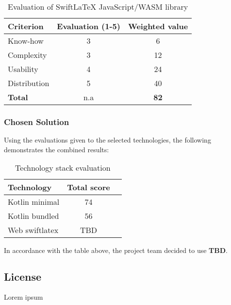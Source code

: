 \begin{table}[H]
    \centering
    \begin{tabular}{|l|c|c|}
        \hline
        \textbf{Criterion} & \textbf{Evaluation (1-5)} & \textbf{Weighted value} \\
        \hline
        Know-how & 3 & 6 \\
        \hline
        Complexity & 3 & 12 \\
        \hline
        Usability & 4 & 24 \\
        \hline
        Distribution & 5 & 40 \\
        \hline
        \textbf{Total} & n.a & \textbf{82} \\
        \hline
    \end{tabular}
    \caption{Evaluation of SwiftLaTeX JavaScript/WASM library}
    \label{table:swiftlatex_evaluation}
\end{table}

\subsubsection{Chosen Solution}
Using the evaluations given to the selected technologies, the following demonstrates the combined results:
\begin{table}[H]
    \centering
    \begin{tabular}{|l|c|c|}
        \hline
        \textbf{Technology} & \textbf{Total score} \\
        \hline
        Kotlin minimal & 74 \\
        \hline
        Kotlin bundled & 56 \\
        \hline
        Web swiftlatex & TBD \\
        \hline
    \end{tabular}
    \caption{Technology stack evaluation}
    \label{table:technology_evaluation}
\end{table}
In accordance with the table above, the project team decided to use \textbf{TBD}.

\subsection{License}
Lorem ipsum